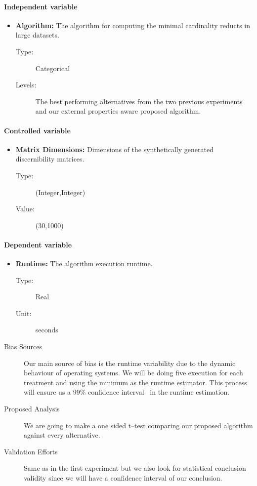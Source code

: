 \documentclass[11pt]{article}   %
\begin{document}
  \paragraph{Independent variable}  
  	\begin{itemize}
  		\item \textbf{Algorithm:} The algorithm for computing the minimal cardinality reducts in large datasets.
  	   		\begin{description}
  	   			\item[Type:] Categorical
  	   			\item[Levels:] The best performing alternatives from the two previous experiments and our external 
	  					   	   properties aware proposed algorithm.
  	   		\end{description}
    \end{itemize}
    \paragraph{Controlled variable}  
  	\begin{itemize}
  	   \item \textbf{Matrix Dimensions:} Dimensions of the synthetically generated discernibility matrices.
  	   		\begin{description}
  	   			\item[Type:] (Integer,Integer)
  	   			\item[Value:] (30,1000)
  	   		\end{description}
    \end{itemize}
    \paragraph{Dependent variable}  
  	\begin{itemize}
  	   \item \textbf{Runtime:} The algorithm execution runtime.
  	   		\begin{description}
  	   			\item[Type:] Real
  	   			\item[Unit:] seconds
  	   		\end{description}
    \end{itemize}
    \begin{description}
    \item[Bias Sources] Our main source of bias is the runtime variability due to the dynamic behaviour of
    					   	operating systems. We will be doing five execution for each treatment and using 
    					   	the minimum as the runtime estimator. This process will ensure us a 99\% confidence
    					   	interval~\cite{Haveraaen01} in the runtime estimation.			   	
    	\item[Proposed Analysis] We are going to make a one sided t--test comparing our proposed algorithm against
    							every alternative.
    	\item[Validation Efforts] Same as in the first experiment but we also look for statistical conclusion
    							 validity since we will have a confidence interval of our conclusion.
  \end{description}
 
\end{document}
